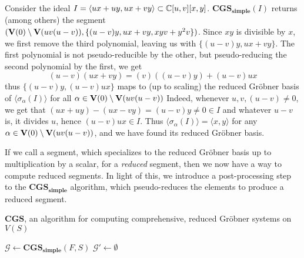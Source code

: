 \begin{example}\upshape
  Consider the ideal $I = \langle ux + uy, ux + vy\rangle \subset \mathbb{C}[u, v][x, y]$. $\mathbf{CGS_{simple}}(I)$ returns (among others) the segment $(\operatorname{\mathbf V}(0) \setminus \operatorname{\mathbf V}(uv(u - v)), \{(u - v)y, ux + vy, xyv + y^{2}v\})$. Since $xy$ is divisible by $x$, we first remove the third polynomial, leaving us with $\{(u - v)y, ux + vy\}$. The first polynomial is not pseudo-reducible by the other, but pseudo-reducing the second polynomial by the first, we get
  \[(u - v)(ux + vy) = (v)((u - v)y) + (u - v)ux\]
  thus $\{(u - v)y, (u - v)ux\}$ maps to (up to scaling) the reduced Gröbner basis of $\langle \sigma_{\alpha}(I) \rangle$ for all $\alpha \in \operatorname{\mathbf V}(0) \setminus \operatorname{\mathbf V}(uv(u - v))$ Indeed, whenever $u, v, (u - v) \neq 0$, we get that $(ux + uy) - (ux - vy) = (u - v)y \neq 0 \in I$ and whatever $u - v$ is, it divides $u$, hence $(u - v)ux \in I$. Thus $\langle \sigma_{\alpha}(I) \rangle = \langle x, y \rangle$ for any $\alpha \in \operatorname{\mathbf V}(0) \setminus \operatorname{\mathbf V}(uv(u - v))$, and we have found its reduced Gröbner basis.
\end{example}

If we call a segment, which specializes to the reduced Gröbner basis up to multiplication by a scalar, for a \textit{reduced} segment, then we now have a way to compute reduced segments. In light of this, we introduce a post-processing step to the $\mathbf{CGS_{simple}}$ algorithm, which pseudo-reduces the elements to produce a reduced segment.

\begin{algorithm}\label{alg:CGS}
  \caption{$\mathbf{CGS}$, an algorithm for computing comprehensive, reduced Gröbner systems on $V(S)$}
  $\mathcal G \gets \mathbf{CGS_{simple}}(F, S)$\;
  $\mathcal G' \gets \emptyset$\;
  \;
\end{algorithm}

